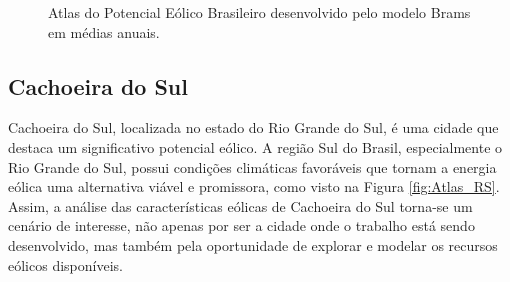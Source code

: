 \begin{figure}[H]
    \caption{Atlas do Potencial Eólico Brasileiro desenvolvido pelo modelo Brams em médias anuais.}      
    \centering
    \label{fig:Atlas}
    \hspace{0.05\textwidth}
    
\end{figure}

\subsection{Cachoeira do Sul}
\par Cachoeira do Sul, localizada no estado do Rio Grande do Sul, é uma cidade que destaca um significativo potencial eólico. A região Sul do Brasil, especialmente o Rio Grande do Sul, possui condições climáticas favoráveis que tornam a energia eólica uma alternativa viável e promissora, como visto na Figura \ref{fig:Atlas_RS}. Assim, a análise das características eólicas de Cachoeira do Sul torna-se um cenário de interesse, não apenas por ser a cidade onde o trabalho está sendo desenvolvido, mas também pela oportunidade de explorar e modelar os recursos eólicos disponíveis.

